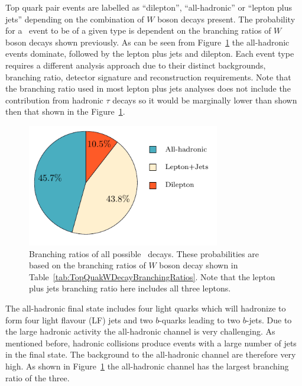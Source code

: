 Top quark pair events are labelled as ``dilepton'', ``all-hadronic'' or ``lepton plus jets'' depending on the combination of $W$ boson decays present. The probability for a \ttbar\ event to be of a given type is dependent on the branching ratios of $W$ boson decays shown previously. As can be seen from Figure~\ref{fig:TopQuarkDecayModes} the all-hadronic events dominate, followed by the lepton plus jets and dilepton. Each event type requires a different analysis approach due to their distinct backgrounds, branching ratio, detector signature and reconstruction requirements. Note that the branching ratio used in most lepton plus jets analyses does not include the contribution from hadronic $\tau$ decays so it would be marginally lower than shown then that shown in the Figure~\ref{fig:TopQuarkDecayModes}. 

\begin{figure}[tbhp]
  \centering
  \includegraphics[width=0.75\textwidth]{PartTopQuark/Diagrams/TopQuarkDecayPie.pdf}
  \caption[Branching ratios of all possible \ttbar\ decays.]{Branching ratios of all possible \ttbar\ decays. These probabilities are based on the branching ratios of $W$ boson decay shown in Table~\ref{tab:TopQuakWDecayBranchingRatios}. Note that the lepton plus jets branching ratio here includes all three leptons.}
  \label{fig:TopQuarkDecayModes}
\end{figure}

The all-hadronic final state includes four light quarks which will hadronize to form four light flavour (LF) jets and two $b$-quarks leading to two $b$-jets. Due to the large hadronic activity the all-hadronic channel is very challenging. As mentioned before, hadronic collisions produce events with a large number of jets in the final state. The background to the all-hadronic channel are therefore very high. As shown in Figure~\ref{fig:TopQuarkDecayModes} the all-hadronic channel has the largest branching ratio of the three.


